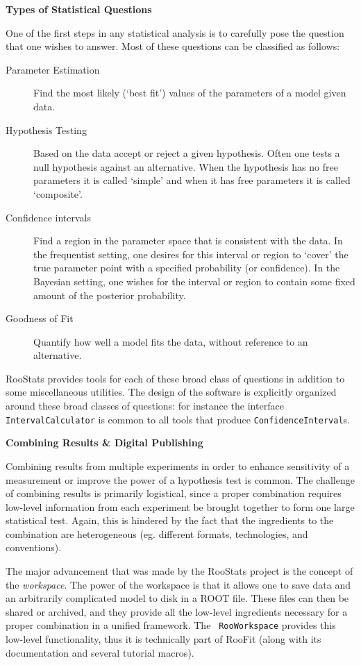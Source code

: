 \documentclass[11pt]{article}
\begin{document}
{\flushleft \textbf{Types of Statistical Questions}}

One of the first steps in any statistical analysis is to carefully pose the question that one wishes to answer.  Most of these questions can be classified as follows:
\begin{description}
 \item[Parameter Estimation] Find the most likely (`best fit') values of the parameters of a model given data.
 \item[Hypothesis Testing] Based on the data accept or reject a given hypothesis.  Often one tests a null hypothesis against an alternative.  When the hypothesis has no free parameters it is called `simple' and when it has free parameters it is called `composite'.
 \item[Confidence intervals] Find a region in the parameter space that is consistent with the data.  In the frequentist setting, one desires for this interval or region to `cover' the true parameter point with a specified probability (or confidence).  In the Bayesian setting, one wishes for the interval or region to contain some fixed amount of the posterior probability.
 \item[Goodness of Fit] Quantify how well a model fits the data, without reference to an alternative.
\end{description}
RooStats provides tools for each of these broad class of questions in addition to some miscellaneous utilities.  The design of the software is explicitly organized around these broad classes of questions: for instance the interface \texttt{IntervalCalculator} is common to all tools that produce \texttt{ConfidenceInterval}s. 

{\flushleft \textbf{Combining Results \& Digital Publishing}}

Combining results from multiple experiments in order to enhance sensitivity of a measurement or improve the power of a hypothesis test is common.  The challenge of combining results is primarily logistical, since a proper combination requires low-level information from each experiment be brought together to form one large statistical test. Again, this is hindered by the fact that the ingredients to the combination are heterogeneous (eg. different formats, technologies, and conventions).  

The major advancement that was made by the RooStats project is the concept of the \textit{workspace}.   The power of the workspace is that it allows one to save data and an arbitrarily complicated model to disk in a ROOT file.  These files can then be shared or archived, and they provide all the low-level ingredients necessary for a proper combination in a unified framework.   The \texttt{ RooWorkspace} provides this low-level functionality, thus it is technically part of RooFit (along with its documentation and several tutorial macros).
\end{document}
